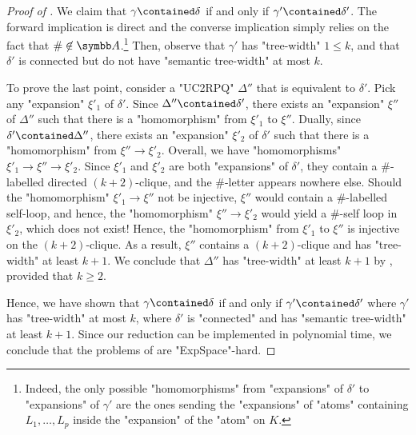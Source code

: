 \begin{proof}[Proof of ]
    We claim that $\gamma \contained \delta$ if and only if $\gamma' \contained \delta'$.
    The forward implication is direct and the converse implication
    simply relies on the fact that $\# \not\in \A$.\footnote{Indeed, the only possible "homomorphisms" from "expansions" of $\delta'$ to "expansions" of $\gamma'$ are the ones sending the "expansions" of "atoms" containing $L_1, \dotsc, L_p$ inside the "expansion" of the "atom" on $K$.}
    Then, observe that $\gamma'$ has "tree-width" $1 \leq k$,
    and that $\delta'$ is connected but do not have "semantic tree-width"
    at most $k$.
    
    To prove the last point, consider a "UC2RPQ" $\Delta''$ that is
    equivalent to $\delta'$. Pick any "expansion" $\xi'_1$ of $\delta'$.
    Since $\Delta'' \contained \delta'$, there exists
    an "expansion" $\xi''$ of $\Delta''$ such that there is a "homomorphism"
    from $\xi'_1$ to $\xi''$. Dually, since $\delta' \contained \Delta''$,
    there exists an "expansion" $\xi'_2$ of $\delta'$ such that there
    is a "homomorphism" from $\xi'' \to \xi'_2$. Overall, we have
    "homomorphisms" $\xi'_1 \to \xi'' \to \xi'_2$.
    Since $\xi'_1$ and $\xi'_2$ are both "expansions" of $\delta'$,
    they contain a $\#$-labelled directed $(k+2)$-clique,
    and the $\#$-letter appears nowhere else.
    Should the "homomorphism" $\xi'_1 \to \xi''$ not be injective,
    $\xi''$ would contain a $\#$-labelled self-loop,
    and hence, the "homomorphism" $\xi'' \to \xi'_2$ would
    yield a $\#$-self loop in $\xi'_2$, which does not exist!
    Hence, the "homomorphism" from $\xi'_1$ to $\xi''$
    is injective on the $(k+2)$-clique.
    As a result, $\xi''$ contains a $(k+2)$-clique
    and has "tree-width" at least $k+1$.
    We conclude that $\Delta''$ has "tree-width" at least $k+1$ by , provided that $k \geq 2$.

    Hence, we have shown that $\gamma \contained \delta$ if and only if $\gamma' \contained \delta'$
    where $\gamma'$ has "tree-width" at most $k$, where $\delta'$ is "connected" and
    has "semantic tree-width" at least $k+1$. Since our reduction
    can be implemented in polynomial time, we conclude that the problems of
     are "ExpSpace"-hard.
\end{proof}